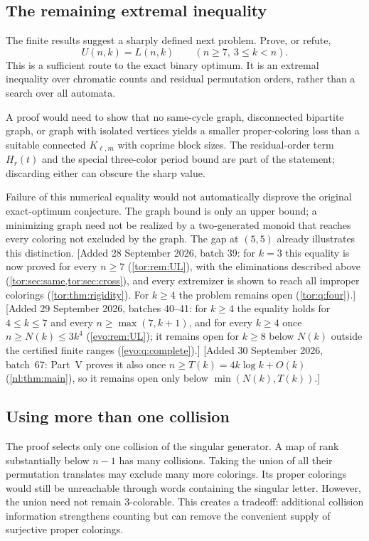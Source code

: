 \documentclass[11pt,a4paper]{article}
\numberwithin{equation}{section}
\theoremstyle{definition}
\theoremstyle{remark}
\begin{document}
\subsection{The remaining extremal inequality}

The finite results suggest a sharply defined next problem. Prove, or refute,
\[
 U(n,k)=L(n,k)\qquad(n\ge7,\ 3\le k<n).
\]
This is a sufficient route to the exact binary optimum. It is an extremal
inequality over chromatic counts and residual permutation orders, rather
than a search over all automata.

A proof would need to show that no same-cycle graph, disconnected bipartite
graph, or graph with isolated vertices yields a smaller proper-coloring
loss than a suitable connected $K_{\ell,m}$ with coprime block sizes.
The residual-order term $H_r(t)$ and the special three-color period bound are
part of the statement; discarding either can obscure the sharp value.

Failure of this numerical equality would not automatically disprove the
original exact-optimum conjecture. The graph bound is only an upper bound;
a minimizing graph need not be realized by a two-generated monoid that
reaches every coloring not excluded by the graph. The gap at $(5,5)$ already
illustrates this distinction.
[Added 28 September 2026, batch 39: for $k=3$ this equality is now proved for
every $n\ge7$ (\cref{tor:rem:UL}), with the eliminations described above
(\cref{tor:sec:same,tor:sec:cross}), and every extremizer is shown to reach
all improper colorings (\cref{tor:thm:rigidity}). For $k\ge4$ the problem
remains open (\cref{tor:q:four}).] [Added 29 September 2026, batches 40--41: for $k\ge4$ the
equality holds for $4\le k\le7$ and every $n\ge\max(7,k+1)$, and for every
$k\ge4$ once $n\ge N(k)\le3k^4$ (\cref{evo:rem:UL}); it remains open for
$k\ge8$ below $N(k)$ outside the certified finite ranges
(\cref{evo:q:complete}).]
[Added 30 September 2026, batch~67: Part~V proves it also once $n\ge T(k)=4k\log k+O(k)$
(\cref{nl:thm:main}), so it remains open only below $\min(N(k),T(k))$.]

\subsection{Using more than one collision}

The proof selects only one collision of the singular generator. A map of
rank substantially below $n-1$ has many collisions. Taking the union of all
their permutation translates may exclude many more colorings. Its proper
colorings would still be unreachable through words containing the singular
letter. However, the union need not remain $3$-colorable. This creates a
tradeoff: additional collision information strengthens counting but can
remove the convenient supply of surjective proper colorings.
\end{document}
